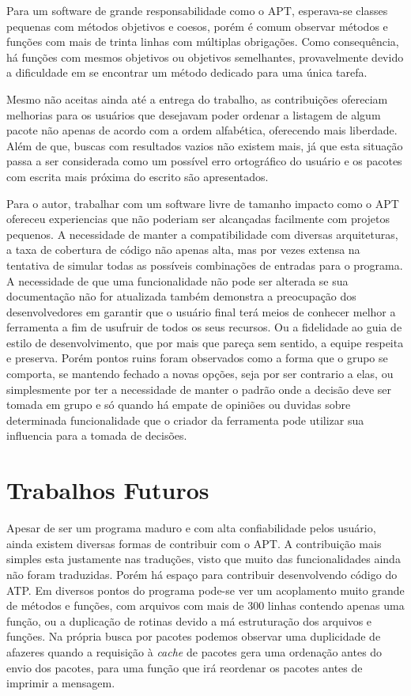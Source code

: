 Para um software de grande responsabilidade como o APT, esperava-se classes pequenas com métodos objetivos e coesos, porém é comum observar métodos e funções com mais de trinta linhas com múltiplas obrigações. Como consequência, há funções com mesmos objetivos ou objetivos semelhantes, provavelmente devido a dificuldade em se encontrar um método dedicado para uma única tarefa.

Mesmo não aceitas ainda até a entrega do trabalho, as contribuições ofereciam melhorias para os usuários que desejavam poder ordenar a listagem de algum pacote não apenas de acordo com a ordem alfabética, oferecendo mais liberdade. Além de que, buscas com resultados vazios não existem mais, já que esta situação passa a ser considerada como um possível erro ortográfico do usuário e os pacotes com escrita mais próxima do escrito são apresentados.

Para o autor, trabalhar com um software livre de tamanho impacto como o {\code APT} ofereceu experiencias que não poderiam ser alcançadas facilmente com projetos pequenos. A necessidade de manter a compatibilidade com diversas arquiteturas, a taxa de cobertura de código não apenas alta, mas por vezes extensa na tentativa de simular todas as possíveis combinações de entradas para o programa. A necessidade de que uma funcionalidade não pode ser alterada se sua documentação não for atualizada também demonstra a preocupação dos desenvolvedores em garantir que o usuário final terá meios de conhecer melhor a ferramenta a fim de usufruir de todos os seus recursos. Ou a fidelidade ao guia de estilo de desenvolvimento, que por mais que pareça sem sentido, a equipe respeita e preserva. Porém pontos ruins foram observados como a forma que o grupo se comporta, se mantendo fechado a novas opções, seja por ser contrario a elas, ou simplesmente por ter a necessidade de manter o padrão onde a decisão deve ser tomada em grupo e só quando há empate de opiniões ou duvidas sobre determinada funcionalidade que o criador da ferramenta pode utilizar sua influencia para a tomada de decisões.

\section*{Trabalhos Futuros} %
\label{sec:trabalhos_futuros}

Apesar de ser um programa maduro e com alta confiabilidade pelos usuário, ainda existem diversas formas de contribuir com o {\code APT}. A contribuição mais simples esta justamente nas traduções, visto que muito das funcionalidades ainda não foram traduzidas. Porém há espaço para contribuir desenvolvendo código do {\code ATP}. Em diversos pontos do programa pode-se ver um acoplamento muito grande de métodos e funções, com arquivos com mais de 300 linhas contendo apenas uma função, ou a duplicação de rotinas devido a má estruturação dos arquivos e funções. Na própria busca por pacotes podemos observar uma duplicidade de afazeres quando a requisição à \textit{cache} de pacotes gera uma ordenação antes do envio dos pacotes, para uma função que irá reordenar os pacotes antes de imprimir a mensagem.

